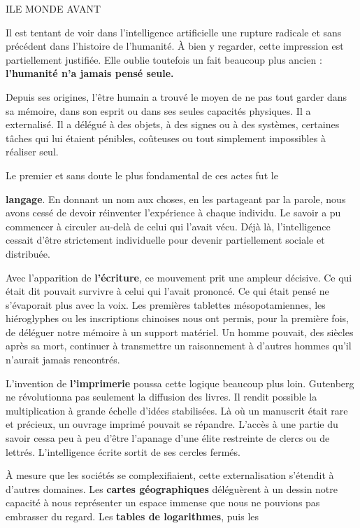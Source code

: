 \begin{partdivider}{I}{LE MONDE AVANT}\end{partdivider}


Il est tentant de voir dans l'intelligence artificielle une rupture radicale et sans précédent dans l'histoire de l'humanité. À bien y regarder, cette impression est partiellement justifiée. Elle oublie toutefois un fait beaucoup plus ancien : \textbf{l'humanité n'a jamais pensé seule.}

Depuis ses origines, l'être humain a trouvé le moyen de ne pas tout garder dans sa mémoire, dans son esprit ou dans ses seules capacités physiques. Il a externalisé. Il a délégué à des objets, à des signes ou à des systèmes, certaines tâches qui lui étaient pénibles, coûteuses ou tout simplement impossibles à réaliser seul.

Le premier et sans doute le plus fondamental de ces actes fut le

\textbf{langage}. En donnant un nom aux choses, en les partageant par la parole, nous avons cessé de devoir réinventer l'expérience à chaque individu. Le savoir a pu commencer à circuler au-delà de celui qui l'avait vécu. Déjà là, l'intelligence cessait d'être strictement individuelle pour devenir partiellement sociale et distribuée.

Avec l'apparition de \textbf{l'écriture}, ce mouvement prit une ampleur décisive. Ce qui était dit pouvait survivre à celui qui l'avait prononcé. Ce qui était pensé ne s'évaporait plus avec la voix. Les premières tablettes mésopotamiennes, les hiéroglyphes ou les inscriptions chinoises nous ont permis, pour la première fois, de déléguer notre mémoire à un support matériel. Un homme pouvait, des siècles après sa mort, continuer à transmettre un raisonnement à d'autres hommes qu'il n'aurait jamais rencontrés.

L'invention de \textbf{l'imprimerie} poussa cette logique beaucoup plus loin. Gutenberg ne révolutionna pas seulement la diffusion des livres. Il rendit possible la multiplication à grande échelle d'idées stabilisées. Là où un manuscrit était rare et précieux, un ouvrage imprimé pouvait se répandre. L'accès à une partie du savoir cessa peu à peu d'être l'apanage d'une élite restreinte de clercs ou de lettrés. L'intelligence écrite sortit de ses cercles fermés.

À mesure que les sociétés se complexifiaient, cette externalisation s'étendit à d'autres domaines. Les \textbf{cartes géographiques} déléguèrent à un dessin notre capacité à nous représenter un espace immense que nous ne pouvions pas embrasser du regard. Les \textbf{tables de logarithmes}, puis les


